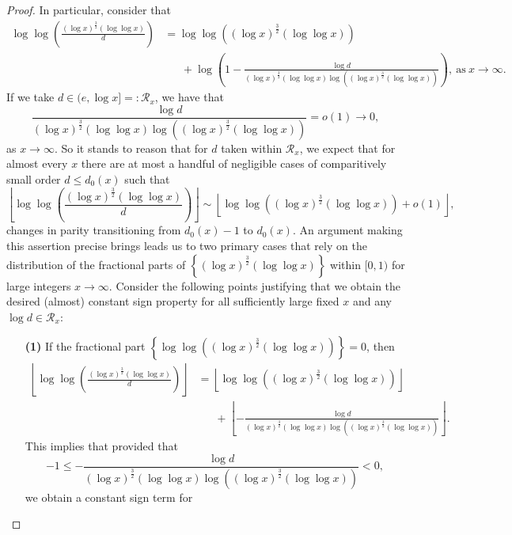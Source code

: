 \documentclass[11pt,reqno,a4letter]{article}
\numberwithin{figure}{section}
\numberwithin{table}{section}
\newcommand{\floor}[1]{\left\lfloor #1 \right\rfloor}
\theoremstyle{plain}
\numberwithin{theorem}{section}
\theoremstyle{definition}
\begin{document}
\begin{proof}
In particular, consider that 
\begin{align*} 
\log\log\left(\frac{(\log x)^{\frac{3}{2}} (\log\log x)}{d}\right) & = 
     \log\log\left((\log x)^{\frac{3}{2}} (\log\log x)\right) \\ 
     & \phantom{=\ } + \log\left(1 - 
     \frac{\log d}{(\log x)^{\frac{3}{2}} (\log\log x) \log\left( 
     (\log x)^{\frac{3}{2}} (\log\log x)\right)}\right), 
     \mathrm{\ as\ } x \rightarrow \infty. 
\end{align*} 
If we take $d \in (e, \log x] =: \mathcal{R}_x$, we have that 
$$\frac{\log d}{(\log x)^{\frac{3}{2}} (\log\log x) \log\left( 
 (\log x)^{\frac{3}{2}} (\log\log x)\right)} = o(1) \rightarrow 0,$$ 
as $x \rightarrow \infty$. 
So it stands to reason that for $d$ taken within $\mathcal{R}_x$, 
we expect that for almost every $x$ there are at most 
a handful of negligible cases of comparitively small order $d \leq d_0(x)$ such that 
\[
\floor{\log\log\left(\frac{(\log x)^{\frac{3}{2}} (\log\log x)}{d}\right)} \sim 
     \floor{\log\log\left((\log x)^{\frac{3}{2}} (\log\log x)\right) + o(1)}, 
\]
changes in parity transitioning from $d_0(x)-1$ to $d_0(x)$. 
An argument making this assertion precise brings leads us to 
two primary cases that rely on the distribution of the fractional parts 
of $\left\{(\log x)^{\frac{3}{2}} (\log\log x)\right\}$ within $[0, 1)$ for 
large integers $x \rightarrow \infty$. 
Consider the following points justifying that we obtain the desired (almost) 
constant sign property for all sufficiently large fixed $x$ and any 
$\log d \in \mathcal{R}_x$: 
\begin{itemize}[itemsep=0pt,topsep=0pt,leftmargin=0.35in] 
\item[\textbf{(1)}] If the fractional part 
     $\left\{\log\log\left((\log x)^{\frac{3}{2}} (\log\log x)\right)\right\} = 0$, then 
     \begin{align*} 
     \floor{\log\log\left(\frac{(\log x)^{\frac{3}{2}} (\log\log x)}{d}\right)} & = 
          \floor{\log\log\left((\log x)^{\frac{3}{2}} (\log\log x)\right)} \\ 
          & \phantom{=\ } + 
          \floor{-\frac{\log d}{(\log x)^{\frac{3}{2}} (\log\log x) \log\left( 
          (\log x)^{\frac{3}{2}} (\log\log x)\right)}}. 
     \end{align*} 
     This implies that provided that 
     \[
     -1 \leq -\frac{\log d}{(\log x)^{\frac{3}{2}} (\log\log x) \log\left( 
          (\log x)^{\frac{3}{2}} (\log\log x)\right)} < 0, 
     \]
     we obtain a constant sign term for 

\end{itemize}
\end{proof}
\end{document}
